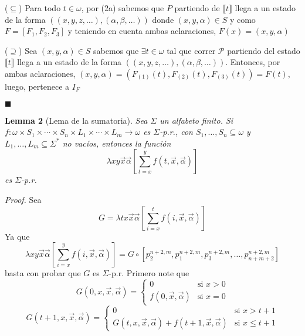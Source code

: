 \documentclass{article}
\begin{document}
($\subseteq$) Para todo $t \in \omega$, por (2a) sabemos que $P$ partiendo de $\llbracket t \rrbracket$ llega a un estado de la forma $((x, y, z, \dots), (\alpha, \beta, \dots))$ donde $(x, y, \alpha) \in S$ y como $F = [F_1, F_2, F_3]$ y teniendo en cuenta ambas aclaraciones, $F(x) = (x, y, \alpha)$\\
\medskip

($\supseteq$) Sea $(x, y, \alpha) \in S$ sabemos que $\exists t \in \omega$ tal que correr $\mathcal{P}$ partiendo del estado $\llbracket t \rrbracket$ llega a un estado de la forma $((x, y, z, \dots), (\alpha, \beta, \dots))$. Entonces, por ambas aclaraciones, $(x, y, \alpha) = (F_{(1)}(t), F_{(2)}(t), F_{(3)}(t)) = F(t)$, luego, pertenece a $I_F$

\hfill $\blacksquare$

\bigskip
\bigskip
\bigskip

\textbf{Lemma 2} (Lema de la sumatoria). \textit{Sea $\Sigma$ un alfabeto finito. Si 
$f : \omega \times S_1 \times \cdots \times S_n \times L_1 \times \cdots \times L_m \to \omega$ 
es $\Sigma$-p.r., con $S_1, \ldots, S_n \subseteq \omega$ y $L_1, \ldots, L_m \subseteq \Sigma^*$ no vacíos, entonces la función
\[
\lambda x y \vec{x} \vec{\alpha} \left[\sum_{t=x}^{y} f(t, \vec{x}, \vec{\alpha})\right]
\]
es $\Sigma$-p.r.}
\bigskip

\textit{Proof.} Sea 
\[
G = \lambda t x \vec{x} \vec{\alpha} \left[\sum_{i=x}^{t} f(i, \vec{x}, \vec{\alpha}) \right]
\]
Ya que
\[
\lambda x y \vec{x} \vec{\alpha} \left[\sum_{i=x}^{y} f(i, \vec{x}, \vec{\alpha}) \right] 
= G \circ \left[p_2^{n+2,m}, p_1^{n+2,m}, p_3^{n+2,m}, \ldots, p_{n+m+2}^{n+2,m} \right]
\]
basta con probar que $G$ es $\Sigma$-p.r. Primero note que
\[
G(0, x, \vec{x}, \vec{\alpha}) = 
\begin{cases}
0 & \text{si } x > 0 \\
f(0, \vec{x}, \vec{\alpha}) & \text{si } x = 0
\end{cases}
\]
\[
G(t+1, x, \vec{x}, \vec{\alpha}) = 
\begin{cases}
0 & \text{si } x > t + 1 \\
G(t, x, \vec{x}, \vec{\alpha}) + f(t + 1, \vec{x}, \vec{\alpha}) & \text{si } x \leq t + 1
\end{cases}
\]
\end{document}
